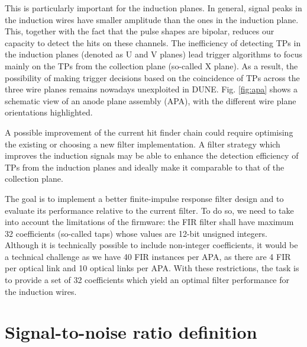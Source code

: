 This is particularly important for the induction planes. In general, signal peaks in the induction wires have smaller amplitude than the ones in the induction plane. This, together with the fact that the pulse shapes are bipolar, reduces our capacity to detect the hits on these channels. The inefficiency of detecting TPs in the induction planes (denoted as U and V planes) lead trigger algorithms to focus mainly on the TPs from the collection plane (so-called X plane). As a result, the possibility of making trigger decisions based on the coincidence of TPs across the three wire planes remains nowadays unexploited in DUNE. Fig. \ref{fig:apa} shows a schematic view of an anode plane assembly (APA), with the different wire plane orientations highlighted.

A possible improvement of the current hit finder chain could require optimising the existing or choosing a new filter implementation. A filter strategy which improves the induction signals may be able to enhance the detection efficiency of TPs from the induction planes and ideally make it comparable to that of the collection plane.

The goal is to implement a better finite-impulse response filter design and to evaluate its performance relative to the current filter. To do so, we need to take into account the limitations of the firmware: the FIR filter shall have maximum 32 coefficients (so-called taps) whose values are 12-bit unsigned integers. Although it is technically possible to include non-integer coefficients, it would be a technical challenge as we have 40 FIR instances per APA, as there are 4 FIR per optical link and 10 optical links per APA. With these restrictions, the task is to provide a set of 32 coefficients which yield an optimal filter performance for the induction wires.

\section{Signal-to-noise ratio definition}
\label{sec:A.1}


